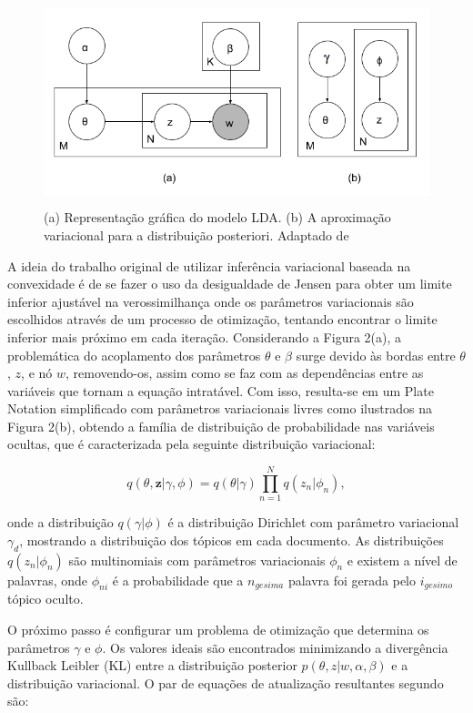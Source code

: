 \documentclass[12pt,a4paper]{article}
\begin{document}
\begin{figure}[H]
	\centering
    \includegraphics[height=6cm]{images/figure_2.png}
    \caption{(a) Representação gráfica do modelo LDA. (b) A aproximação variacional para a distribuição posteriori. Adaptado de }
\end{figure}

A ideia do trabalho original de utilizar inferência variacional baseada na convexidade é de se fazer o uso da desigualdade de Jensen para obter um limite inferior ajustável na verossimilhança \cite{jordan1999introduction} onde os parâmetros variacionais são escolhidos através de um processo de otimização,
 tentando encontrar o limite inferior mais próximo em cada iteração. Considerando a Figura 2(a), a problemática do acoplamento dos parâmetros $\theta$ e $\beta$ surge devido às bordas entre $\theta$, $z$,
 e nó $w$, removendo-os, assim como se faz com as dependências entre as variáveis que tornam a equação intratável. Com isso,
 resulta-se em um Plate Notation simplificado com parâmetros variacionais livres como ilustrados na Figura 2(b), obtendo a família de distribuição de probabilidade nas variáveis ocultas,
 que é caracterizada pela seguinte distribuição variacional:

\begin{equation}
q(\theta,\textbf{z}|\gamma,\phi)=q(\theta|\gamma)\prod_{n=1}^{N}q(z_n|\phi_n), 
\end{equation}

onde a distribuição  $q(\gamma|\phi)$ é a distribuição Dirichlet com parâmetro variacional $\gamma_d$, mostrando a distribuição dos tópicos em cada documento.
 As distribuições $q(z_n | \phi_n)$ são multinomiais com parâmetros variacionais $\phi_n$ e existem a nível de palavras, onde $\phi_{ni}$ é a probabilidade que a $n_{gesima}$ palavra foi gerada pelo $i_{gesimo}$ tópico oculto.

O próximo passo é configurar um problema de otimização que determina os parâmetros $\gamma$ e $\phi$. Os valores ideais são encontrados minimizando a divergência Kullback Leibler (KL) entre a distribuição posterior $p(\theta, z|w,\alpha,\beta)$ e a distribuição variacional.
 O par de equações de atualização resultantes segundo  são:
\end{document}
